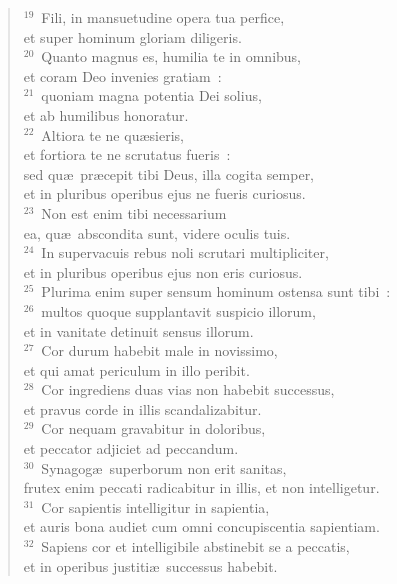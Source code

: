 \begin{flushleft}\begin{verse}${}^{19}$~Fili, in mansuetudine opera tua perfice,\\ et super hominum gloriam diligeris.\\
${}^{20}$~Quanto magnus es, humilia te in omnibus,\\ et coram Deo invenies gratiam~:\\
${}^{21}$~quoniam magna potentia Dei solius,\\ et ab humilibus honoratur.\\
${}^{22}$~Altiora te ne qu\ae sieris,\\ et fortiora te ne scrutatus fueris~:\\ sed qu\ae\ pr\ae cepit tibi Deus, illa cogita semper,\\ et in pluribus operibus ejus ne fueris curiosus.\\
${}^{23}$~Non est enim tibi necessarium\\ ea, qu\ae\ abscondita sunt, videre oculis tuis.\\
${}^{24}$~In supervacuis rebus noli scrutari multipliciter,\\ et in pluribus operibus ejus non eris curiosus.\\
${}^{25}$~Plurima enim super sensum hominum ostensa sunt tibi~:\\
${}^{26}$~multos quoque supplantavit suspicio illorum,\\ et in vanitate detinuit sensus illorum.\\
${}^{27}$~Cor durum habebit male in novissimo,\\ et qui amat periculum in illo peribit.\\
${}^{28}$~Cor ingrediens duas vias non habebit successus,\\ et pravus corde in illis scandalizabitur.\\
${}^{29}$~Cor nequam gravabitur in doloribus,\\ et peccator adjiciet ad peccandum.\\
${}^{30}$~Synagog\ae\ superborum non erit sanitas,\\ frutex enim peccati radicabitur in illis, et non intelligetur.\\
${}^{31}$~Cor sapientis intelligitur in sapientia,\\ et auris bona audiet cum omni concupiscentia sapientiam.\\
${}^{32}$~Sapiens cor et intelligibile abstinebit se a peccatis,\\ et in operibus justiti\ae\ successus habebit.\end{verse}\end{flushleft}


